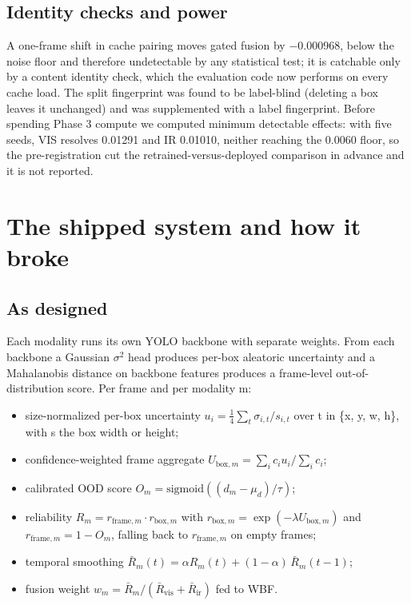 \documentclass[journal,onecolumn]{IEEEtran}
\begin{document}
\subsection{Identity checks and power}\label{app:C.7}
A one-frame shift in cache pairing moves gated fusion by $-$0.000968, below the noise floor and therefore undetectable by any statistical test; it is catchable only by a content identity check, which the evaluation code now performs on every cache load. The split fingerprint was found to be label-blind (deleting a box leaves it unchanged) and was supplemented with a label fingerprint. Before spending Phase 3 compute we computed minimum detectable effects: with five seeds, VIS resolves 0.01291 and IR 0.01010, neither reaching the 0.0060 floor, so the pre-registration cut the retrained-versus-deployed comparison in advance and it is not reported.

\FloatBarrier
\section{The shipped system and how it broke}\label{app:D}
\subsection{As designed}\label{app:D.1}
Each modality runs its own YOLO backbone with separate weights. From each backbone a Gaussian $\sigma$$^{2}$ head produces per-box aleatoric uncertainty and a Mahalanobis distance on backbone features produces a frame-level out-of-distribution score. Per frame and per modality m:

\begin{itemize}
\item size-normalized per-box uncertainty $u_i = \frac{1}{4}\sum_t \sigma_{i,t}/s_{i,t}$ over t in \{x, y, w, h\}, with s the box width or height;
\item confidence-weighted frame aggregate $U_{\mathrm{box},m} = \sum_i c_i u_i / \sum_i c_i$;
\item calibrated OOD score $O_m = \mathrm{sigmoid}((d_m - \mu_d)/\tau)$;
\item reliability $R_m = r_{\mathrm{frame},m} \cdot r_{\mathrm{box},m}$ with $r_{\mathrm{box},m} = \exp(-\lambda U_{\mathrm{box},m})$ and $r_{\mathrm{frame},m} = 1 - O_m$, falling back to $r_{\mathrm{frame},m}$ on empty frames;
\item temporal smoothing $\bar{R}_m(t) = \alpha R_m(t) + (1 - \alpha)\,\bar{R}_m(t-1)$;
\item fusion weight $w_m = \bar{R}_m / (\bar{R}_{\mathrm{vis}} + \bar{R}_{\mathrm{ir}})$ fed to WBF.
\end{itemize}
\end{document}
